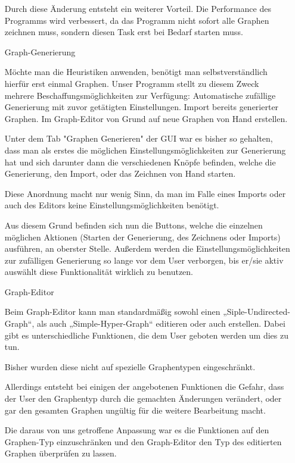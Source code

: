 \documentclass{article}
\begin{document}
\begin{enumerate}
{				%
				Durch diese Änderung entsteht ein weiterer Vorteil.
				Die Performance des Programms wird verbessert, da das Programm nicht sofort alle Graphen zeichnen muss, sondern diesen Task erst bei Bedarf starten muss.
			}
		
		\item[Graph-Generierung]{
			Möchte man die Heuristiken anwenden, benötigt man selbstverständlich hierfür erst einmal Graphen.
			Unser Programm stellt zu diesem Zweck mehrere Beschaffungsmöglichkeiten zur Verfügung:
				Automatische zufällige Generierung mit zuvor getätigten Einstellungen.
				Import bereits generierter Graphen.
				Im Graph-Editor von Grund auf neue Graphen von Hand erstellen.
			
			Unter dem Tab "Graphen Generieren" der GUI war es bisher so gehalten, dass man als erstes die möglichen Einstellungsmöglichkeiten zur Generierung hat und sich darunter dann die verschiedenen Knöpfe befinden, welche die Generierung, den Import, oder das Zeichnen von Hand starten.
			
			Diese Anordnung macht nur wenig Sinn, da man im Falle eines Imports oder auch des Editors keine Einstellungsmöglichkeiten benötigt.
			
			Aus diesem Grund befinden sich nun die Buttons, welche die einzelnen möglichen Aktionen (Starten der Generierung, des Zeichnens oder Imports) ausführen, an oberster Stelle.
			Außerdem werden die Einstellungsmöglichkeiten zur zufälligen Generierung so lange vor dem User verborgen, bis er/sie aktiv auswählt diese Funktionalität wirklich zu benutzen.
		}
	
		\item[Graph-Editor]{
			Beim Graph-Editor kann man standardmäßig sowohl einen „Siple-Undirected-Graph“, als auch „Simple-Hyper-Graph“ editieren oder auch erstellen.
			Dabei gibt es unterschiedliche Funktionen, die dem User geboten werden um dies zu tun.
			
			Bisher wurden diese nicht auf spezielle Graphentypen eingeschränkt.
			
			Allerdings entsteht bei einigen der angebotenen Funktionen die Gefahr, dass der User den Graphentyp durch die gemachten Änderungen verändert, oder gar den gesamten Graphen ungültig für die weitere Bearbeitung macht.
			
			Die daraus von uns getroffene Anpassung war es die Funktionen auf den Graphen-Typ einzuschränken und den Graph-Editor den Typ des editierten Graphen überprüfen zu lassen.
		}
		\end{enumerate}
	
\end{document}

